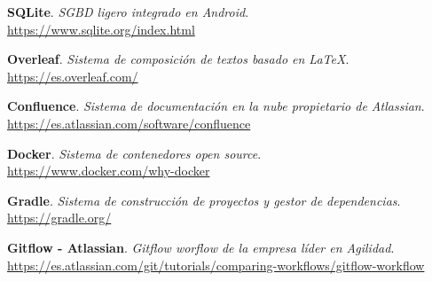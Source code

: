\begin{thebibliography}{X}
\textbf{SQLite}. \textit{SGBD ligero integrado en Android}. \\
\small{\url{https://www.sqlite.org/index.html}}

\textbf{Overleaf}. \textit{Sistema de composición de textos basado en \LaTeX}. \\
\small{\url{https://es.overleaf.com/}}

\textbf{Confluence}. \textit{Sistema de documentación en la nube propietario de Atlassian}. \\
\small{\url{https://es.atlassian.com/software/confluence}}

\textbf{Docker}. \textit{Sistema de contenedores open source}. \\
\small{\url{https://www.docker.com/why-docker}}

\textbf{Gradle}. \textit{Sistema de construcción de proyectos y gestor de dependencias}. \\
\small{\url{https://gradle.org/}}

\textbf{Gitflow - Atlassian}. \textit{Gitflow worflow de la empresa líder en Agilidad}. \\
\small{\url{https://es.atlassian.com/git/tutorials/comparing-workflows/gitflow-workflow}}



\end{thebibliography}